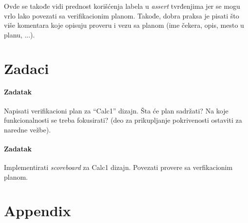 Ovde se takođe vidi prednost korišćenja labela u \emph{assert} tvrđenjima jer
se mogu vrlo lako povezati sa verifikacionim planom. Takođe, dobra praksa je
pisati što više komentara koje opisuju proveru i vezu sa planom (ime čekera,
opis, mesto u planu, ...).


\section{Zadaci}

\paragraph{Zadatak}

Napisati verifikacioni plan za ``Calc1'' dizajn. Šta će plan sadržati? Na koje
funkcionalnosti se treba fokusirati? (deo za prikupljanje pokrivenosti ostaviti
za naredne vežbe).

\paragraph{Zadatak}

Implementirati \emph{scoreboard} za Calc1 dizajn. Povezati provere sa
verfikacionim planom.


\section{Appendix}



